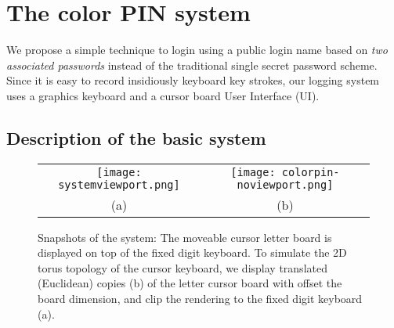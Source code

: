 \documentclass[12pt,onecolumn]{article}
\begin{document}
 

\section{The color PIN system\label{sec:colorPIN}}

We propose a simple technique to login using a public login name based on {\em two associated passwords} instead of the traditional single secret password scheme.
Since it is easy to record insidiously keyboard key strokes, our logging system uses a  graphics keyboard and a  cursor board  User Interface (UI).
 

\subsection{Description of the basic system}



\begin{figure}
\centering
 \begin{tabular}{cc}
 \texttt{[image: systemviewport.png]}  &
 \texttt{[image: colorpin-noviewport.png]}\\
 (a) & (b)
 \end{tabular}
  
\caption{
Snapshots of the system: The moveable   cursor letter board   is displayed on top of the fixed digit keyboard.  
To simulate the 2D torus topology of the cursor keyboard, we display  translated (Euclidean) copies (b) of the letter cursor board with offset the board dimension, and clip the rendering to the fixed digit keyboard (a). 
\label{fig:torus}}
\end{figure} 
\end{document}
